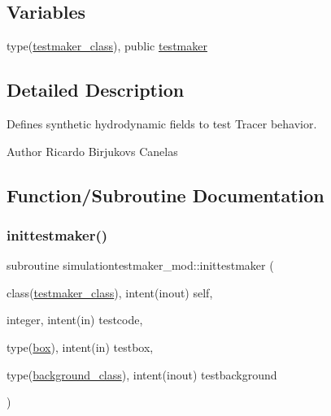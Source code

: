 \subsection*{Variables}
\begin{DoxyCompactItemize}
\item 
type(\mbox{\hyperlink{structsimulationtestmaker__mod_1_1testmaker__class}{testmaker\+\_\+class}}), public \mbox{\hyperlink{namespacesimulationtestmaker__mod_a344a43a231fc0e61e77875fa7ec95b12}{testmaker}}
\end{DoxyCompactItemize}


\subsection{Detailed Description}
Defines synthetic hydrodynamic fields to test Tracer behavior. 

\begin{DoxyAuthor}{Author}
Ricardo Birjukovs Canelas 
\end{DoxyAuthor}


\subsection{Function/\+Subroutine Documentation}
\mbox{\label{namespacesimulationtestmaker__mod_a4ad5df056a516e03a3d1c17f6d3046cf}} 
\subsubsection{\texorpdfstring{inittestmaker()}{inittestmaker()}}
{\footnotesize\ttfamily subroutine simulationtestmaker\+\_\+mod\+::inittestmaker (\begin{DoxyParamCaption}\item[{class(\mbox{\hyperlink{structsimulationtestmaker__mod_1_1testmaker__class}{testmaker\+\_\+class}}), intent(inout)}]{self,  }\item[{integer, intent(in)}]{testcode,  }\item[{type(\mbox{\hyperlink{structgeometry__mod_1_1box}{box}}), intent(in)}]{testbox,  }\item[{type(\mbox{\hyperlink{structbackground__mod_1_1background__class}{background\+\_\+class}}), intent(inout)}]{testbackground }\end{DoxyParamCaption})\hspace{0.3cm}{\ttfamily [private]}}



